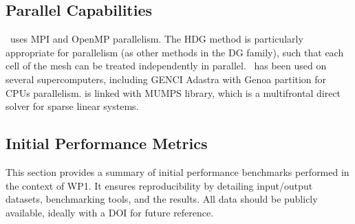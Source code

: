 \subsection{Parallel Capabilities}
\label{sec:WP1:Hawen:performances}

\hawen~uses MPI and OpenMP parallelism. The HDG method is particularly 
appropriate for parallelism (as other methods in the DG family), such 
that each cell of the mesh can be treated independently in parallel. 
\hawen~has been used on several supercomputers, including GENCI Adastra
with Genoa partition for CPUs parallelism.
\hawen is linked with MUMPS library, which is a multifrontal direct solver 
for sparse linear systems. 



\subsection{Initial Performance Metrics}
\label{sec:WP1:Hawen:metrics}

This section provides a summary of initial performance benchmarks performed in the context of WP1. It ensures reproducibility by detailing input/output datasets, benchmarking tools, and the results. All data should be publicly available, ideally with a DOI for future reference.

